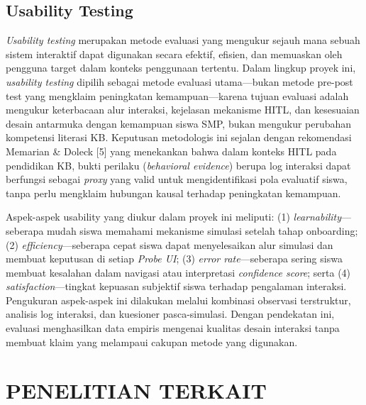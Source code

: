 \documentclass[10pt,twoside,openright]{report}
\begin{document}
\subsection{Usability Testing}
\label{subsec:usability-testing}

\textit{Usability testing} merupakan metode evaluasi yang mengukur sejauh mana sebuah sistem interaktif dapat digunakan secara efektif, efisien, dan memuaskan oleh pengguna target dalam konteks penggunaan tertentu. Dalam lingkup proyek ini, \textit{usability testing} dipilih sebagai metode evaluasi utama---bukan metode pre-post test yang mengklaim peningkatan kemampuan---karena tujuan evaluasi adalah mengukur keterbacaan alur interaksi, kejelasan mekanisme HITL, dan kesesuaian desain antarmuka dengan kemampuan siswa SMP, bukan mengukur perubahan kompetensi literasi KB. Keputusan metodologis ini sejalan dengan rekomendasi Memarian \& Doleck [5] yang menekankan bahwa dalam konteks HITL pada pendidikan KB, bukti perilaku (\textit{behavioral evidence}) berupa log interaksi dapat berfungsi sebagai \textit{proxy} yang valid untuk mengidentifikasi pola evaluatif siswa, tanpa perlu mengklaim hubungan kausal terhadap peningkatan kemampuan.

Aspek-aspek usability yang diukur dalam proyek ini meliputi: (1) \textit{learnability}---seberapa mudah siswa memahami mekanisme simulasi setelah tahap onboarding; (2) \textit{efficiency}---seberapa cepat siswa dapat menyelesaikan alur simulasi dan membuat keputusan di setiap \textit{Probe UI}; (3) \textit{error rate}---seberapa sering siswa membuat kesalahan dalam navigasi atau interpretasi \textit{confidence score}; serta (4) \textit{satisfaction}---tingkat kepuasan subjektif siswa terhadap pengalaman interaksi. Pengukuran aspek-aspek ini dilakukan melalui kombinasi observasi terstruktur, analisis log interaksi, dan kuesioner pasca-simulasi. Dengan pendekatan ini, evaluasi menghasilkan data empiris mengenai kualitas desain interaksi tanpa membuat klaim yang melampaui cakupan metode yang digunakan.

\section{PENELITIAN TERKAIT}
\label{sec:penelitian-terkait}
\end{document}
